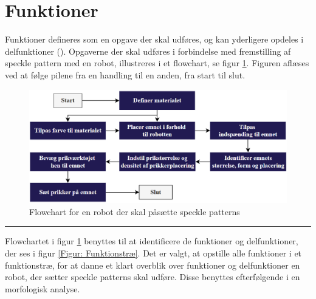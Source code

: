 \section{Funktioner} \label{Funktioner}
Funktioner defineres som en opgave der skal udføres, og kan yderligere opdeles i delfunktioner (\cite{Ullman2018TheProcess}). Opgaverne der skal udføres i forbindelse med fremstilling af speckle pattern med en robot, illustreres i et flowchart, se figur \ref{fig: flowchart}. Figuren aflæses ved at følge pilene fra en handling til en anden, fra start til slut. 

\begin{figure}[H]
    \centering
    \includegraphics[width=1\linewidth]{Sections/5 Konceptgenerering/Media/Flowchart.png}
    \caption{Flowchart for en robot der skal påsætte speckle patterns}
    \label{fig: flowchart}
\end{figure} \plainbreak{-0.5}

Flowchartet i figur \ref{fig: flowchart} benyttes til at identificere de funktioner og delfunktioner, der ses i figur \ref{Figur: Funktionstræ}. Det er valgt, at opstille alle funktioner i et funktionstræ, for at danne et klart overblik over funktioner og delfunktioner en robot, der sætter speckle patterns skal udføre. Disse benyttes efterfølgende i en morfologisk analyse.  



